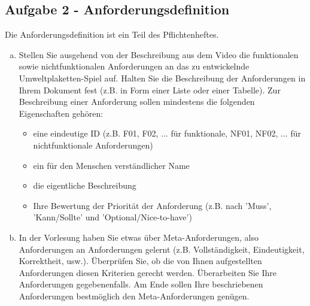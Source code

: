     \subsection{Aufgabe 2 - Anforderungsdefinition}
    
        \begin{aufgabe}
            Die Anforderungsdefinition ist ein Teil des Pflichtenheftes.
            \\[-.7cm]\begin{enumerate}[(a)]
                \setlength\itemsep{0.1px}
                \item Stellen Sie ausgehend von der Beschreibung aus dem Video die funktionalen sowie nichtfunktionalen Anforderungen an das zu entwickelnde Umweltplaketten-Spiel auf. Halten Sie die Beschreibung der Anforderungen in Ihrem Dokument fest (z.B. in Form einer Liste oder einer Tabelle). Zur Beschreibung einer Anforderung sollen mindestens die folgenden Eigenschaften gehören:
                \\[-.7cm]\begin{itemize}
                    \setlength\itemsep{0.1px}
                    \item eine eindeutige ID (z.B. F01, F02, ... für funktionale, NF01, NF02, ... für nichtfunktionale Anforderungen)
                    \item ein für den Menschen verständlicher Name
                    \item die eigentliche Beschreibung
                    \item Ihre Bewertung der Priorität der Anforderung (z.B. nach 'Muss', 'Kann/Sollte' und 'Optional/Nice-to-have') 
                \end{itemize}
                \item In der Vorlesung haben Sie etwas über Meta-Anforderungen, also Anforderungen an Anforderungen gelernt (z.B. Vollständigkeit, Eindeutigkeit, Korrektheit, usw.). Überprüfen Sie, ob die von Ihnen aufgestellten Anforderungen diesen Kriterien gerecht werden. Überarbeiten Sie Ihre Anforderungen gegebenenfalls. Am Ende sollen Ihre beschriebenen Anforderungen bestmöglich den Meta-Anforderungen genügen.
            \end{enumerate}
        \end{aufgabe}
    
